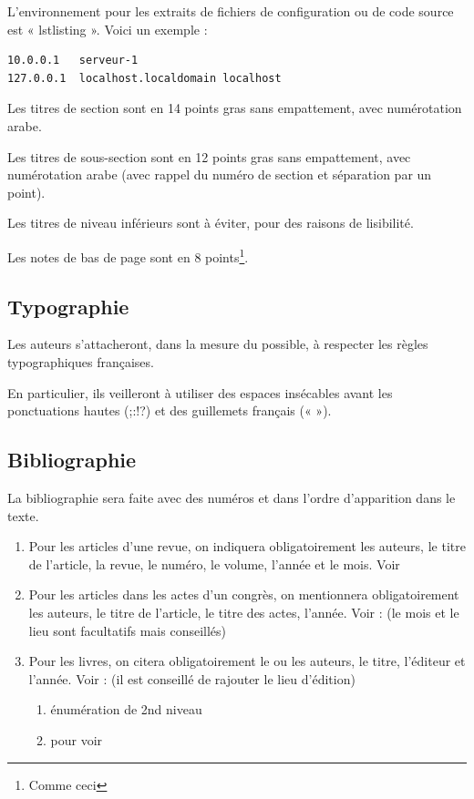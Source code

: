 \documentclass{jres}
\begin{document}
L'environnement pour les extraits de fichiers de configuration ou 
de code source  est « lstlisting ». Voici un exemple :

\begin{lstlisting}
10.0.0.1   serveur-1
127.0.0.1  localhost.localdomain localhost
\end{lstlisting}

Les titres de section sont en 14 points gras sans empattement, avec
numérotation arabe.

Les titres de sous-section sont en 12 points gras sans empattement,
avec numérotation arabe (avec rappel du numéro de section et
séparation par un point).

Les titres de niveau inférieurs sont à éviter, pour des raisons de
lisibilité.

Les notes de bas de page sont en 8 points\footnote{Comme ceci}. 

\subsection{Typographie}

Les auteurs s'attacheront, dans la mesure du possible, à respecter les
règles typographiques françaises.

En particulier, ils veilleront à utiliser des espaces insécables avant
les ponctuations hautes (;:!?) et des guillemets français (« »).

\subsection{Bibliographie}

La bibliographie sera faite avec des numéros et dans l'ordre
d'apparition dans le texte.

\begin{enumerate}

\item Pour les articles d'une revue, on indiquera obligatoirement les
  auteurs, le titre de l'article, la revue, le numéro, le volume,
  l'année et le mois. Voir \cite{exemple1}

\item Pour les articles dans les actes d'un congrès, on mentionnera
  obligatoirement les auteurs, le titre de l'article, le titre des
  actes, l'année. Voir : \cite{exemple2} (le mois et le lieu sont
  facultatifs mais conseillés)

\item Pour les livres, on citera obligatoirement le ou les auteurs, le
  titre, l'éditeur et l'année. Voir : \cite{exemple3} (il est conseillé de
  rajouter le lieu d'édition)

\begin{enumerate}
\item énumération de 2nd niveau
\item pour voir
\end{enumerate}
\end{enumerate}
\end{document}
